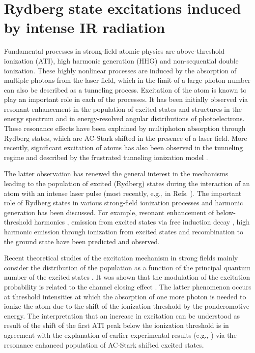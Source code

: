\chapter{Rydberg state excitations induced by intense IR radiation} %
\label{cha:rydberg_state_excitations}

Fundamental processes in strong-field atomic physics are above-threshold ionization (ATI), high harmonic generation (HHG) and non-sequential double ionization. These highly nonlinear processes are induced by the absorption of multiple photons from the laser field, which in the limit of a large photon number can also be described as a tunneling process. Excitation of the atom is known to play an important role in each of the processes. It has been initially observed via resonant enhancement in the population of excited states \cite{deboer92,jones92} and structures in the energy spectrum \cite{freeman87,perry89,agostini89} and in energy-resolved angular distributions \cite{rottke94} of photoelectrons. These resonance effects have been explained by multiphoton absorption through Rydberg states, which are AC-Stark shifted in the presence of a laser field. More recently, significant excitation of atoms has also been observed in the tunneling regime and described by the frustrated tunneling ionization model .  

The latter observation has renewed the general interest in the mechanisms leading to the population of excited (Rydberg) states during the interaction of an atom with an intense laser pulse (most recently, e.g., in Refs. \cite{chini14,li14,li14b,zimmermann15,shao15,camp15,li15,fechner15,bredtmann16,fushitani16,lv16,serebryannikov16,hart16,li16,xiong16,beaulieu16,larimian16,zimmermann17,bengtsson17,gao17,ivanov17,ilchen17,mancuso17,xiong17b,piraux17}). The important role of Rydberg states in various strong-field ionization processes and harmonic generation has been discussed. For example, resonant enhancement of below-threshold harmonics \cite{toma99,chini14,camp15}, emission from excited states via free induction decay \cite{camp15,beaulieu16}, high harmonic emission through ionization from excited states and recombination to the ground state \cite{bian10,beaulieu16} have been predicted and observed.

Recent theoretical studies of the excitation mechanism in strong fields mainly consider the distribution of the population as a function of the principal quantum number of the excited states \cite{li14,li14b,zimmermann17,xiong17b,piraux17}. It was shown that the modulation of the excitation probability is related to the channel closing effect \cite{krajewska12,li14,li14b,piraux17}. The latter phenomenon occurs at threshold intensities at which the absorption of one more photon is needed to ionize the atom due to the shift of the ionization threshold by the ponderomotive energy. The interpretation that an increase in excitation can be understood as result of the shift of the first ATI peak below the ionization threshold \cite{li14,li14b} is in agreement with the explanation of earlier experimental results (e.g., \cite{freeman87,jones92,rottke94}) via the resonance enhanced population of AC-Stark shifted excited states. 

